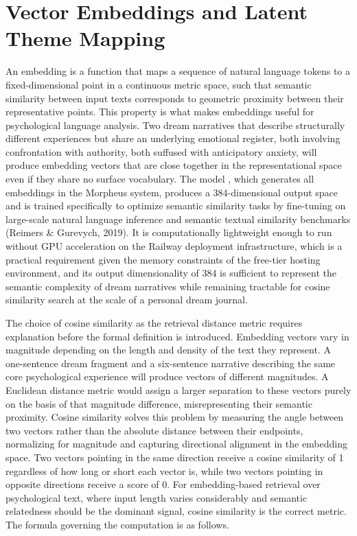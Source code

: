 \documentclass[12pt,a4paper]{report}
\DeclareRobustCommand{\code}[1]{\texttt{\detokenize{#1}}}
\begin{document}
\section{Vector Embeddings and Latent Theme Mapping}
An embedding is a function that maps a sequence of natural language tokens to a fixed-dimensional point in a continuous metric space, such that semantic similarity between input texts corresponds to geometric proximity between their representative points. This property is what makes embeddings useful for psychological language analysis. Two dream narratives that describe structurally different experiences but share an underlying emotional register, both involving confrontation with authority, both suffused with anticipatory anxiety, will produce embedding vectors that are close together in the representational space even if they share no surface vocabulary. The \code{sentence-transformers} model \code{all-MiniLM-L6-v2}, which generates all embeddings in the Morpheus system, produces a \num{384}-dimensional output space and is trained specifically to optimize semantic similarity tasks by fine-tuning on large-scale natural language inference and semantic textual similarity benchmarks (Reimers \& Gurevych, 2019). It is computationally lightweight enough to run without GPU acceleration on the Railway deployment infrastructure, which is a practical requirement given the memory constraints of the free-tier hosting environment, and its output dimensionality of 384 is sufficient to represent the semantic complexity of dream narratives while remaining tractable for cosine similarity search at the scale of a personal dream journal.

The choice of cosine similarity as the retrieval distance metric requires explanation before the formal definition is introduced. Embedding vectors vary in magnitude depending on the length and density of the text they represent. A one-sentence dream fragment and a six-sentence narrative describing the same core psychological experience will produce vectors of different magnitudes. A Euclidean distance metric would assign a larger separation to these vectors purely on the basis of that magnitude difference, misrepresenting their semantic proximity. Cosine similarity solves this problem by measuring the angle between two vectors rather than the absolute distance between their endpoints, normalizing for magnitude and capturing directional alignment in the embedding space. Two vectors pointing in the same direction receive a cosine similarity of 1 regardless of how long or short each vector is, while two vectors pointing in opposite directions receive a score of 0. For embedding-based retrieval over psychological text, where input length varies considerably and semantic relatedness should be the dominant signal, cosine similarity is the correct metric. The formula governing the computation is as follows.
\end{document}
